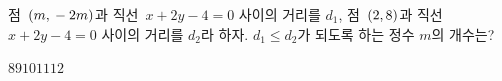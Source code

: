 점~$(m{,}\mkern3mu -2m)$과 직선~$x+2y-4=0$ 사이의 거리를 $d_1$, 점~$(2{,}\mkern3mu 8)$과 직선~$x+2y-4=0$ 사이의 거리를 $d_2$라 하자. $d_1\le d_2$가 되도록 하는 정수 $m$의 개수는?
\begin{choices32}{$8$}{$9$}{$10$}{$11$}{$12$}\end{choices32}
